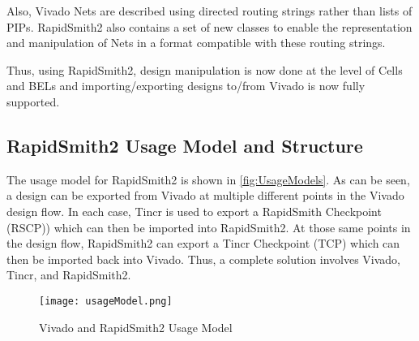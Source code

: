 Also, Vivado Nets are described using directed routing strings rather than lists
of PIPs.  RapidSmith2 also contains a set of new classes to enable the representation
and manipulation of Nets in a format compatible with these routing strings.

Thus, using RapidSmith2, design manipulation is now done at the level of Cells and BELs
and importing/exporting designs to/from Vivado is now fully supported.

\subsection{RapidSmith2 Usage Model and Structure}
The usage model for RapidSmith2 is shown in \autoref{fig:UsageModels}.  As can be
seen, a design can be exported from Vivado at multiple different points in the
Vivado design flow.  In each case, Tincr is used to export a RapidSmith
Checkpoint (RSCP)) which can then be imported into RapidSmith2.  At those same points in
the design flow, RapidSmith2 can export a Tincr Checkpoint (TCP) which can then be
imported back into Vivado.
Thus, a complete solution involves Vivado, Tincr, and RapidSmith2.

\begin{figure}[htb]
\centering
\texttt{[image: usageModel.png]}
\caption{Vivado and RapidSmith2 Usage Model}
\label{fig:UsageModels}
\end{figure} 
